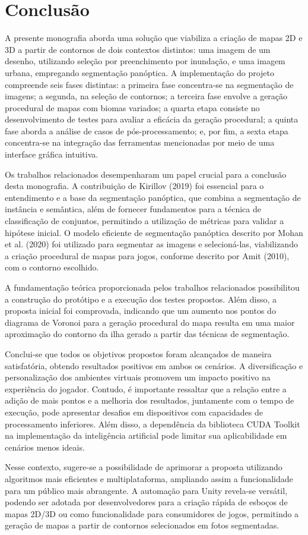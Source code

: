 \section{Conclusão}

A presente monografia aborda uma solução que viabiliza a criação de mapas 2D e 3D a partir de contornos de dois contextos distintos: uma imagem de um desenho, utilizando seleção por preenchimento por inundação, e uma imagem urbana, empregando segmentação panóptica. A implementação do projeto compreende seis fases distintas: a primeira fase concentra-se na segmentação de imagens; a segunda, na seleção de contornos; a terceira fase envolve a geração procedural de mapas com biomas variados; a quarta etapa consiste no desenvolvimento de testes para avaliar a eficácia da geração procedural; a quinta fase aborda a análise de casos de pós-processamento; e, por fim, a sexta etapa concentra-se na integração das ferramentas mencionadas por meio de uma interface gráfica intuitiva.

Os trabalhos relacionados desempenharam um papel crucial para a conclusão desta monografia. A contribuição de Kirillov (2019) foi essencial para o entendimento e a base da segmentação panóptica, que combina a segmentação de instância e semântica, além de fornecer fundamentos para a técnica de classificação de conjuntos, permitindo a utilização de métricas para validar a hipótese inicial. O modelo eficiente de segmentação panóptica descrito por Mohan et al. (2020) foi utilizado para segmentar as imagens e selecioná-las, viabilizando a criação procedural de mapas para jogos, conforme descrito por Amit (2010), com o contorno escolhido.

A fundamentação teórica proporcionada pelos trabalhos relacionados possibilitou a construção do protótipo e a execução dos testes propostos. Além disso, a proposta inicial foi comprovada, indicando que um aumento nos pontos do diagrama de Voronoi para a geração procedural do mapa resulta em uma maior aproximação do contorno da ilha gerado a partir das técnicas de segmentação.

Conclui-se que todos os objetivos propostos foram alcançados de maneira satisfatória, obtendo resultados positivos em ambos os cenários. A diversificação e personalização dos ambientes virtuais promovem um impacto positivo na experiência do jogador. Contudo, é importante ressaltar que a relação entre a adição de mais pontos e a melhoria dos resultados, juntamente com o tempo de execução, pode apresentar desafios em dispositivos com capacidades de processamento inferiores. Além disso, a dependência da biblioteca CUDA Toolkit na implementação da inteligência artificial pode limitar sua aplicabilidade em cenários menos ideais.

Nesse contexto, sugere-se a possibilidade de aprimorar a proposta utilizando algoritmos mais eficientes e multiplataforma, ampliando assim a funcionalidade para um público mais abrangente. A automação para Unity revela-se versátil, podendo ser adotada por desenvolvedores para a criação rápida de esboços de mapas 2D/3D ou como funcionalidade para consumidores de jogos, permitindo a geração de mapas a partir de contornos selecionados em fotos segmentadas.
